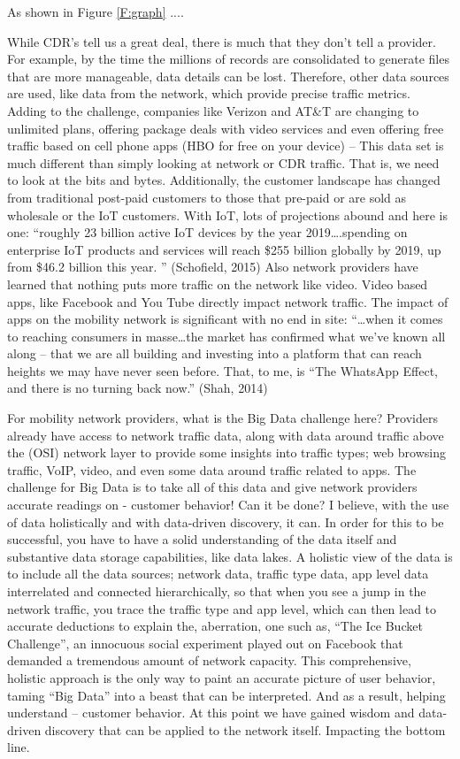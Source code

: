 \documentclass[sigconf]{acmart}
\begin{document}
As shown in Figure \ref{F:graph} ....


While CDR’s tell us a great deal, there is much that they don’t tell a
provider.  For example, by the time the millions of records are
consolidated to generate files that are more manageable, data details
can be lost.  Therefore, other data sources are used, like data from
the network, which provide precise traffic metrics.  Adding to the
challenge, companies like Verizon and AT\&T are changing to unlimited
plans, offering package deals with video services and even offering
free traffic based on cell phone apps (HBO for free on your device) –
This data set is much different than simply looking at network or CDR
traffic. That is, we need to look at the bits and bytes. Additionally,
the customer landscape has changed from traditional post-paid
customers to those that pre-paid or are sold as wholesale or the IoT
customers.  With IoT, lots of projections abound and here is one:
``roughly 23 billion active IoT devices by the year 2019….spending on
enterprise IoT products and services will reach
\$255 billion globally by 2019, up from \$46.2 billion this year. ''
(Schofield, 2015) Also network providers have learned that nothing
puts more traffic on the network like video.  Video based apps, like
Facebook and You Tube directly impact network traffic.  The impact of
apps on the mobility network is significant with no end in site:
``…when it comes to reaching consumers in masse…the market has
confirmed what we’ve known all along – that we are all building and
investing into a platform that can reach heights we may have never
seen before.  That, to me, is ``The WhatsApp Effect, and there is no
turning back now.'' (Shah, 2014) \cite{??}

For mobility network providers, what is the Big Data challenge here?
Providers already have access to network traffic data, along with data
around traffic above the (OSI) network layer to provide some insights
into traffic types; web browsing traffic, VoIP, video, and even some
data around traffic related to apps.  The challenge for Big Data is to
take all of this data and give network providers accurate readings on
- customer behavior!  Can it be done?  I believe, with the use of data
holistically and with data-driven discovery, it can.  In order for
this to be successful, you have to have a solid understanding of the
data itself and substantive data storage capabilities, like data
lakes.  A holistic view of the data is to include all the data
sources; network data, traffic type data, app level data interrelated
and connected hierarchically, so that when you see a jump in the
network traffic, you trace the traffic type and app level, which can
then lead to accurate deductions to explain the, aberration, one such
as, ``The Ice Bucket Challenge'', an innocuous social experiment played
out on Facebook that demanded a tremendous amount of network capacity.
This comprehensive, holistic approach is the only way to paint an
accurate picture of user behavior, taming ``Big Data'' into a beast that
can be interpreted.  And as a result, helping understand – customer
behavior.  At this point we have gained wisdom and data-driven
discovery that can be applied to the network itself.  Impacting the
bottom line.
\end{document}
